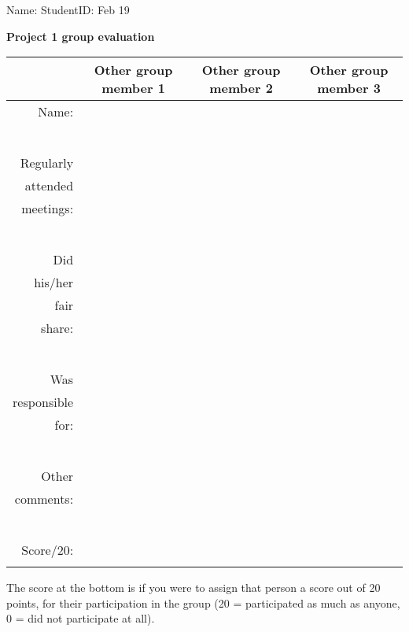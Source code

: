 \documentclass{article}
\begin{document}
\thispagestyle{empty}

Name: \underline{\hspace{2in}} StudentID: \underline{\hspace{2in}} Feb 19  


\newcommand{\oneend}{&& &\\}
\newcommand{\myend}{\oneend \oneend\oneend\oneend\oneend\oneend\oneend\hline}
\textbf{Project 1 group evaluation}

\begin{tabular}{r|c|c|c} 
& 
  Other group member 1\hspace{1cm} &
  Other group member 2\hspace{1cm} & 
  Other group member 3\hspace{1cm} \\
\hline
Name: \myend
Regularly &&&\\
attended&&&\\ meetings: \myend
Did &&&\\
 his/her &&&\\
 fair &&&\\ share: \myend
Was &&&\\
responsible&&&\\
 for: \myend
Other &&&\\
 comments: \myend
Score/20: & & &\\ 
&&&\\
\hline
\end{tabular}

The score at the bottom is if you were to assign that person a score
out of 20 points, for their participation in the group (20 =
participated as much as anyone, 0 = did not participate at all). 
\end{document}
